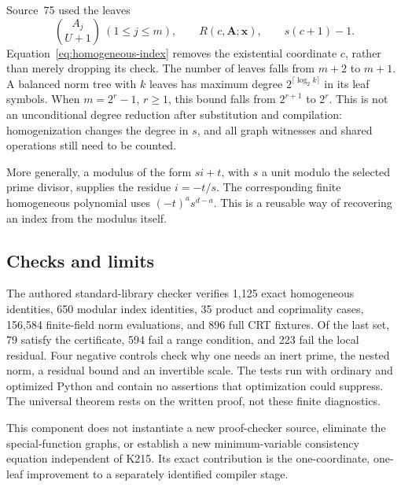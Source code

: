 Source~75 used the leaves
\[
 \binom{A_j}{U+1}\ (1\le j\le m),\qquad
 R(c,\mathbf A;\mathbf x),\qquad s(c+1)-1.
\]
Equation~\eqref{eq:homogeneous-index} removes the existential coordinate
\(c\), rather than merely dropping its check.  The number of leaves falls
from \(m+2\) to \(m+1\).  A balanced norm tree with \(k\) leaves has maximum
degree \(2^{\lceil\log_2k\rceil}\) in its leaf symbols.  When
\(m=2^r-1\), \(r\ge1\), this bound falls from \(2^{r+1}\) to \(2^r\).
This is not an unconditional degree reduction after substitution and
compilation: homogenization changes the degree in \(s\), and all graph
witnesses and shared operations still need to be counted.

More generally, a modulus of the form \(si+t\), with \(s\) a unit modulo
the selected prime divisor, supplies the residue \(i=-t/s\).  The
corresponding finite homogeneous polynomial uses \((-t)^a s^{d-a}\).
This is a reusable way of recovering an index from the modulus itself.

\subsection{Checks and limits}

The authored standard-library checker verifies 1,125 exact homogeneous
identities, 650 modular index identities, 35 product and coprimality cases,
156,584 finite-field norm evaluations, and 896 full CRT fixtures.  Of the
last set, 79 satisfy the certificate, 594 fail a range condition, and 223
fail the local residual.  Four negative controls check why one needs an
inert prime, the nested norm, a residual bound and an invertible scale.
The tests run with ordinary and optimized Python and contain no assertions
that optimization could suppress.  The universal theorem rests on the
written proof, not these finite diagnostics.

This component does not instantiate a new proof-checker source, eliminate
the special-function graphs, or establish a new minimum-variable
consistency equation independent of K215.  Its exact contribution is the
one-coordinate, one-leaf improvement to a separately identified compiler
stage.
